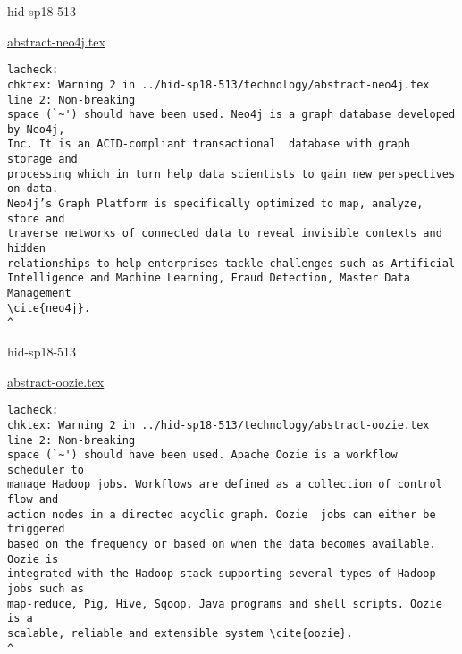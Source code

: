 

\begin{IU}

hid-sp18-513

\href{https://github.com/cloudmesh-community/hid-sp18-513/blob/master//technology/abstract-neo4j.tex}{abstract-neo4j.tex}

\begin{tiny}
\begin{verbatim}
lacheck: 
chktex: Warning 2 in ../hid-sp18-513/technology/abstract-neo4j.tex line 2: Non-breaking
space (`~') should have been used. Neo4j is a graph database developed by Neo4j,
Inc. It is an ACID-compliant transactional  database with graph storage and
processing which in turn help data scientists to gain new perspectives on data.
Neo4j’s Graph Platform is specifically optimized to map, analyze, store and
traverse networks of connected data to reveal invisible contexts and hidden
relationships to help enterprises tackle challenges such as Artificial
Intelligence and Machine Learning, Fraud Detection, Master Data Management
\cite{neo4j}.
^
\end{verbatim}
\end{tiny}
\end{IU}



\begin{IU}

hid-sp18-513

\href{https://github.com/cloudmesh-community/hid-sp18-513/blob/master//technology/abstract-oozie.tex}{abstract-oozie.tex}

\begin{tiny}
\begin{verbatim}
lacheck: 
chktex: Warning 2 in ../hid-sp18-513/technology/abstract-oozie.tex line 2: Non-breaking
space (`~') should have been used. Apache Oozie is a workflow scheduler to
manage Hadoop jobs. Workflows are defined as a collection of control flow and
action nodes in a directed acyclic graph. Oozie  jobs can either be triggered
based on the frequency or based on when the data becomes available. Oozie is
integrated with the Hadoop stack supporting several types of Hadoop jobs such as
map-reduce, Pig, Hive, Sqoop, Java programs and shell scripts. Oozie is a
scalable, reliable and extensible system \cite{oozie}.
^
\end{verbatim}
\end{tiny}
\end{IU}

